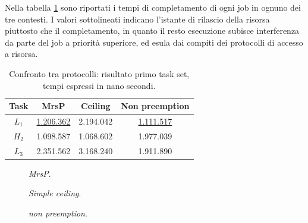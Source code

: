 \noindent Nella tabella \ref{tab:test_protocols_Taskset1_ris} sono riportati i tempi di completamento di ogni job in ognuno dei tre contesti. I valori sottolineati indicano l'istante di rilascio della risorsa piuttosto che il completamento, in quanto il resto esecuzione subisce interferenza da parte del job a priorità superiore, ed esula dai compiti dei protocolli di accesso a risorsa.\\

\begin{table}
  \centering
  \begin{tabular}{cccc}
  \hline\hline
    Task & MrsP & Ceiling & Non preemption \\ \hline
    $L_1$ & \underline{1.206.362} & 2.194.042 & \underline{1.111.517} \\
    $H_2$ & 1.098.587 & 1.068.602 & 1.977.039 \\
    $L_3$ & 2.351.562 & 3.168.240 & 1.911.890 \\
    \hline
    \end{tabular}
  \caption{Confronto tra protocolli: risultato primo task set, tempi espressi in nano secondi.}
  \label{tab:test_protocols_Taskset1_ris}
\end{table}

    \begin{figure}
      \centering
      \RisultatoUnoMrsP
      \caption{\textit{MrsP}.}
      \label{fig:test_protocols_mrsp}
    \end{figure}

    \begin{figure}
      \centering
      \RisultatoUnoCeiling
      \caption{\textit{Simple ceiling}.}
      \label{fig:test_protocols_sc}
    \end{figure}
    
    \begin{figure}
      \centering
      \RisultatoUnoNoPreempion
      \caption{\textit{non preemption}.}
      \label{fig:test_protocols_np}
    \end{figure}

